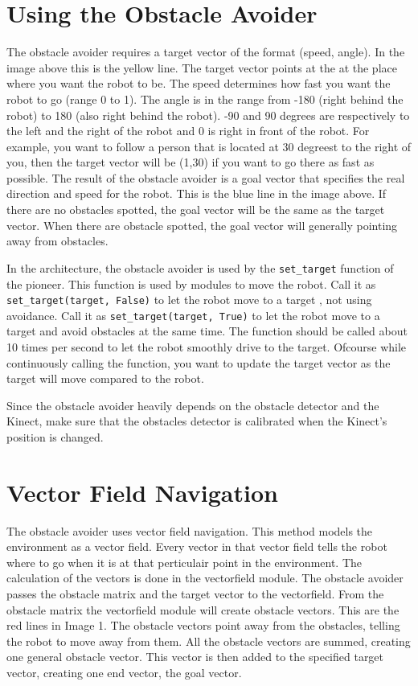 \documentclass[a4paper, 12pt, oneside]{report}
\begin{document}
\section{Using the Obstacle Avoider}
The obstacle avoider requires a target vector of the format (speed, angle). 
In the image above this is the yellow line. 
The target vector points at the at the place where you want the robot to be. 
The speed determines how fast you want the robot to go (range 0 to 1). 
The angle is in the range from -180 (right behind the robot) to 180 (also right behind the robot). 
-90 and 90 degrees are respectively to the left and the right of the robot and 0 is right in front of the robot.  
For example, you want to follow a person that is located at 30 degreest to the right of you, then the target vector will be (1,30) if you want to go there as fast as possible. 
The result of the obstacle avoider is a goal vector that specifies the real direction and speed for the robot. 
This is the blue line in the image above. 
If there are no obstacles spotted, the goal vector will be the same as the target vector. 
When there are obstacle spotted, the goal vector will generally pointing away from obstacles.

In the architecture, the obstacle avoider is used by the \lstinline{set_target} function of the pioneer. 
This function is used by modules to move the robot. 
Call it as \lstinline{set_target(target, False)} to let the robot move to a target , not using avoidance. 
Call it as \lstinline{set_target(target, True)} to let the robot move to a target and avoid obstacles at the same time.
The function should be called about 10 times per second to let the robot smoothly drive to the target. 
Ofcourse while continuously calling the function, you want to update the target vector as the target will move compared to the robot.

Since the obstacle avoider heavily depends on the obstacle detector and the Kinect, make sure that the obstacles detector is calibrated when the Kinect's position is changed.

\section{Vector Field Navigation}
The obstacle avoider uses vector field navigation. 
This method models the environment as a vector field. 
Every vector in that vector field tells the robot where to go when it is at that perticulair point in the environment. 
The calculation of the vectors is done in the vectorfield module. 
The obstacle avoider passes the obstacle matrix and the target vector to the vectorfield. 
From the obstacle matrix the vectorfield module will create obstacle vectors. 
This are the red lines in Image 1. 
The obstacle vectors point away from the obstacles, telling the robot to move away from them. 
All the obstacle vectors are summed, creating one general obstacle vector. 
This vector is then added to the specified target vector, creating one end vector, the goal vector.
\end{document}
